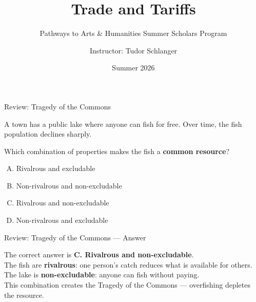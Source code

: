 \documentclass[9pt,english,aspectratio=169]{beamer}
\title{\textbf{Trade and Tariffs}}
\subtitle{Pathways to Arts \& Humanities Summer Scholars Program}
\author{Instructor: Tudor Schlanger}
\date{Summer 2026}
\begin{document}
\begin{frame}
  \titlepage
\end{frame}


\begin{frame}{Review: Tragedy of the Commons}

  \begin{questionbox}
    A town has a public lake where anyone can fish for free.
    Over time, the fish population declines sharply.

    \vspace{0.5em}
    Which combination of properties makes the fish a \textbf{common resource}?
  \end{questionbox}

  \vspace{0.6em}
  \begin{enumerate}[A.]
    \item Rivalrous and excludable
    \item Non-rivalrous and non-excludable
    \item Rivalrous and non-excludable
    \item Non-rivalrous and excludable
  \end{enumerate}

\end{frame}

\begin{frame}{Review: Tragedy of the Commons --- Answer}

  \begin{answerbox}
    The correct answer is \textbf{C. Rivalrous and non-excludable}.\\[0.5em]
    The fish are \textbf{rivalrous}: one person's catch reduces what is available for others.\\[0.3em]
    The lake is \textbf{non-excludable}: anyone can fish without paying.\\[0.3em]
    This combination creates the Tragedy of the Commons --- overfishing depletes the resource.
  \end{answerbox}

\end{frame}
\end{document}

